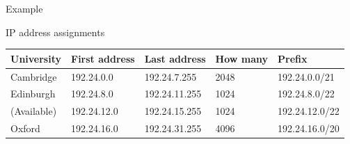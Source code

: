 \begin{frame}{Example}
  \begin{center}
  \end{center}
  \begin{iblock}{IP address assignments}{\scriptsize\ttfamily
      \begin{tabular}{lllll}\toprule
        \textrm{University}&\textrm{First address}&\textrm{Last address}&\textrm{How many}&\textrm{Prefix}\\\midrule
        Cambridge&192.24.0.0&192.24.7.255&2048&192.24.0.0/21\\
        Edinburgh&192.24.8.0&192.24.11.255&1024&192.24.8.0/22\\
        (Available)&192.24.12.0&192.24.15.255&1024&192.24.12.0/22\\
        Oxford&192.24.16.0&192.24.31.255&4096&192.24.16.0/20\\\bottomrule
      \end{tabular}}
  \end{iblock}
\end{frame}
